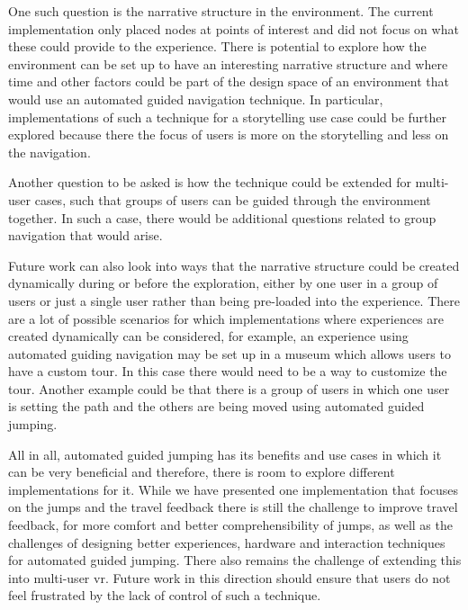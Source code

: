 One such question is the narrative structure in the environment. The current implementation only placed nodes at points of interest and did not focus on what these could provide to the experience. There is potential to explore how the environment can be set up to have an interesting narrative structure and where time and other factors could be part of the design space of an environment that would use an automated guided navigation technique. In particular, implementations of such a technique for a storytelling use case could be further explored because there the focus of users is more on the storytelling and less on the navigation.

Another question to be asked is how the technique could be extended for multi-user cases, such that groups of users can be guided through the environment together. In such a case, there would be additional questions related to group navigation that would arise.

Future work can also look into ways that the narrative structure could be created dynamically during or before the exploration, either by one user in a group of users or just a single user rather than being pre-loaded into the experience. There are a lot of possible scenarios for which implementations where experiences are created dynamically can be considered, for example, an experience using automated guiding navigation may be set up in a museum which allows users to have a custom tour. In this case there would need to be a way to customize the tour. Another example could be that there is a group of users in which one user is setting the path and the others are being moved using automated guided jumping.

All in all, automated guided jumping has its benefits and use cases in which it can be very beneficial and therefore, there is room to explore different implementations for it. While we have presented one implementation that focuses on the jumps and the travel feedback there is still the challenge to improve travel feedback, for more comfort and better comprehensibility of jumps, as well as the challenges of designing better experiences, hardware and interaction techniques for automated guided jumping. There also remains the challenge of extending this into multi-user \acrshort{vr}. Future work in this direction should ensure that users do not feel frustrated by the lack of control of such a technique.

 